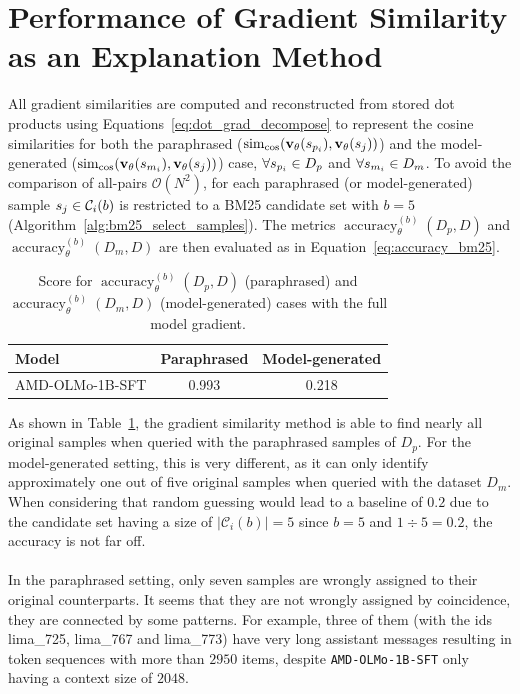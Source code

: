 \section{Performance of Gradient Similarity as an Explanation Method}\label{sec:baseline_perf}
All gradient similarities are computed and reconstructed from stored dot products using Equations~\ref{eq:dot_grad_decompose} to represent the cosine similarities for both the paraphrased ($\operatorname{sim}_{\cos}(\mathbf{v}_{\theta}(s_{p_i}), \mathbf{v}_{\theta}(s_j))$) and the model-generated ($\operatorname{sim}_{\cos}(\mathbf{v}_{\theta}(s_{m_i}), \mathbf{v}_{\theta}(s_j))$) case, $\forall s_{p_i} \in D_p$ and $\forall s_{m_i} \in D_m$. To avoid the comparison of all-pairs $\mathcal{O}(N^2)$, for each paraphrased (or model-generated) sample $s_j \in \mathcal{C}_i(b)$ is restricted to a BM25 candidate set with $b=5$ (Algorithm~\ref{alg:bm25_select_samples}). The metrics $\operatorname{accuracy}^{(b)}_{\theta}(D_p,D)$ and $\operatorname{accuracy}^{(b)}_{\theta}(D_m,D)$ are then evaluated as in Equation~\ref{eq:accuracy_bm25}.
\begin{table}[htb]
    \centering
    \begin{tabular}{|l|c|c|}
        \hline
        \textbf{Model} & \textbf{Paraphrased} & \textbf{Model-generated} \\
        \hline
        AMD-OLMo-1B-SFT & 0.993 & 0.218 \\
        \hline
    \end{tabular}
    \caption{Score for $\operatorname{accuracy}^{(b)}_{\theta}(D_p,D)$ (paraphrased) and $\operatorname{accuracy}^{(b)}_{\theta}(D_m,D)$ (model-generated) cases with the full model gradient.}
    \label{tab:model_accuracy}
\end{table}
As shown in Table~\ref{tab:model_accuracy}, the gradient similarity method is able to find nearly all original samples when queried with the paraphrased samples of $D_p$. For the model-generated setting, this is very different, as it can only identify approximately one out of five original samples when queried with the dataset $D_m$. When considering that random guessing would lead to a baseline of $0.2$ due to the candidate set having a size of $\lvert\mathcal{C}_i(b)\rvert = 5$ since $b=5$ and $1 \div 5=0.2$, the accuracy is not far off.
\\\\
In the paraphrased setting, only seven samples are wrongly assigned to their original counterparts. It seems that they are not wrongly assigned by coincidence, they are connected by some patterns. For example, three of them (with the ids lima\_725, lima\_767 and lima\_773) have very long assistant messages resulting in token sequences with more than $2950$ items, despite \texttt{AMD-OLMo-1B-SFT} only having a context size of $2048$. 

